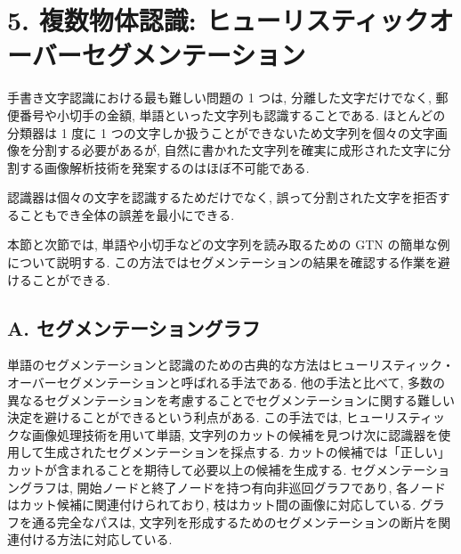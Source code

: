 \documentclass[twocolumn]{jarticle}     %
\begin{document}
\section*{5. 複数物体認識: ヒューリスティックオーバーセグメンテーション}
手書き文字認識における最も難しい問題の 1 つは, 分離した文字だけでなく, 郵便番号や小切手の金額, 単語といった文字列も認識することである. ほとんどの分類器は 1 度に 1 つの文字しか扱うことができないため文字列を個々の文字画像を分割する必要があるが, 自然に書かれた文字列を確実に成形された文字に分割する画像解析技術を発案するのはほぼ不可能である.
\par

認識器は個々の文字を認識するためだけでなく, 誤って分割された文字を拒否することもでき全体の誤差を最小にできる.
\par
本節と次節では, 単語や小切手などの文字列を読み取るための GTN の簡単な例について説明する. この方法ではセグメンテーションの結果を確認する作業を避けることができる.

\subsection*{A. セグメンテーショングラフ}
単語のセグメンテーションと認識のための古典的な方法はヒューリスティック・オーバーセグメンテーションと呼ばれる手法である.
他の手法と比べて, 多数の異なるセグメンテーションを考慮することでセグメンテーションに関する難しい決定を避けることができるという利点がある. この手法では, ヒューリスティックな画像処理技術を用いて単語, 文字列のカットの候補を見つけ次に認識器を使用して生成されたセグメンテーションを採点する.
カットの候補では「正しい」カットが含まれることを期待して必要以上の候補を生成する.
セグメンテーショングラフは, 開始ノードと終了ノードを持つ有向非巡回グラフであり, 各ノードはカット候補に関連付けられており, 枝はカット間の画像に対応している. グラフを通る完全なパスは, 文字列を形成するためのセグメンテーションの断片を関連付ける方法に対応している. 
\end{document}
